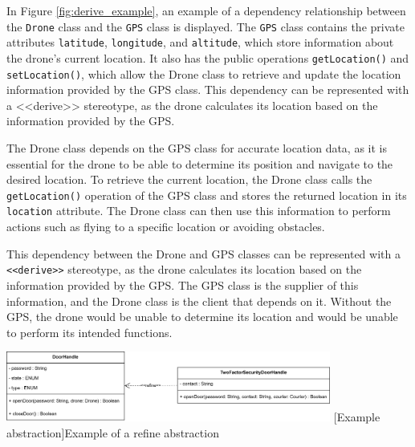 \documentclass[
	12pt,
    a4paper,
    egregdoesnotlikesansseriftitles, %
    toc=chapterentrywithdots,
    oneside, openany,
    titlepage,
    parskip=half,
    headings=normal,  %
    listof=totoc,
    bibliography=totoc,
    index=totoc,
    captions=tableheading,  %
    listof=flat,
    numbers=noenddot, %
    final]
    {scrbook}
\begin{document}

In Figure \ref{fig:derive_example}, an example of a dependency relationship between the \texttt{Drone} class and the \texttt{GPS} class is displayed. 
The \texttt{GPS} class contains the private attributes \texttt{latitude}, \texttt{longitude}, and \texttt{altitude}, which store information about the drone's current location. It also has the public operations \texttt{getLocation()} and \texttt{setLocation()}, which allow the Drone class to retrieve and update the location information provided by the GPS class.
This dependency can be represented with a <<derive>> stereotype, as the drone calculates its location based on the information provided by the GPS.

The Drone class depends on the GPS class for accurate location data, as it is essential for the drone to be able to determine its position and navigate to the desired location. To retrieve the current location, the Drone class calls the \texttt{getLocation()} operation of the GPS class and stores the returned location in its \texttt{location} attribute. The Drone class can then use this information to perform actions such as flying to a specific location or avoiding obstacles.

This dependency between the Drone and GPS classes can be represented with a \texttt{<<derive>>} stereotype, as the drone calculates its location based on the information provided by the GPS. 
The GPS class is the supplier of this information, and the Drone class is the client that depends on it. 
Without the GPS, the drone would be unable to determine its location and would be unable to perform its intended functions.



\vspace{1em}
\begin{minipage}{\linewidth}
	\centering
	\includegraphics[width=0.8\textwidth]{figures/dependencies/refine.jpg}
	[Example abstraction]{Example of a refine abstraction}
	\label{fig:refine_example}
\end{minipage}
\vspace{1em}
\end{document}
